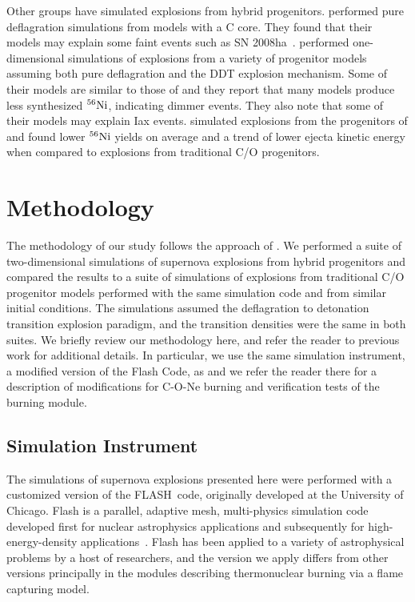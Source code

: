 \documentclass[iop,apj]{emulateapj}
\newcommand{\Ni}[1]{\ensuremath{{}^{#1}{\rm Ni}}}
\newcommand{\code}[1]{\textsc{#1}}
\newcommand{\FLASH}{\code{FLASH}}
\begin{document}
Other groups have simulated explosions from hybrid progenitors.
\citet{kromeretal2015} performed pure deflagration simulations from models
with a C core. They found that their models may explain some faint events
such as SN 2008ha~\citep{foleyetal2009}.
\citet{bravoetal2016} performed one-dimensional simulations of explosions from
a variety of progenitor models assuming both pure deflagration and the DDT
explosion mechanism.
Some of their models are similar to those of \citep{denissenkovetal2015} and
they report that many models produce less synthesized
\Ni{56}, indicating dimmer events. They also note that some of their
models may explain Iax events.
\citet{willcoxetal2016} simulated explosions from the progenitors of
\citet{denissenkovetal2015} and found lower
\Ni{56} yields on average and a trend of lower ejecta kinetic energy
when compared to explosions from traditional C/O progenitors.


\section{Methodology}

The methodology of our study follows the approach of \citet{willcoxetal2016}.
We performed a suite of two-dimensional simulations of supernova explosions
from hybrid progenitors and compared the results to a suite of simulations
of explosions from traditional C/O progenitor models performed with the
same simulation code and from similar initial conditions. The simulations assumed
the deflagration to detonation transition explosion paradigm, and the
transition densities were the same in both suites. We briefly review our methodology
here, and refer the reader to previous work for additional details.
In particular, we use the same simulation instrument, a modified version
of the Flash Code, as \citet{willcoxetal2016} and we refer the reader there
for a description of modifications for C-O-Ne burning and verification tests
of the burning module.

\subsection{Simulation Instrument}

The simulations of supernova explosions presented here were performed
with a customized version of the \FLASH\ code, originally developed
at the University of Chicago.
Flash is a parallel, adaptive mesh, multi-physics simulation code
developed first for nuclear astrophysics applications and subsequently
for high-energy-density applications~\citep{Fryxetal00,calder.curtis.ea:high-performance,
calder.fryxell.ea:on,flash_pragmatic,flash_evolution}.
Flash has been applied to a variety of astrophysical problems by a host
of researchers, and the version we apply differs from other versions
principally in the modules describing thermonuclear burning via a
flame capturing model.
\end{document}
